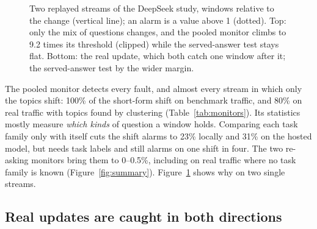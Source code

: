 \documentclass[11pt]{article}
\begin{document}
\begin{figure}[t]
  \caption{Two replayed streams of the DeepSeek study, windows relative to the
  change (vertical line); an alarm is a value above 1 (dotted). Top: only the mix of
  questions changes, and the pooled monitor climbs to 9.2 times its threshold
  (clipped) while the served-answer test stays flat. Bottom: the real update, which
  both catch one window after it; the served-answer test by the wider margin.}
  \label{fig:streams}
\end{figure}

The pooled monitor detects every fault, and almost every stream in which only the
topics shift: 100\% of the short-form shift on benchmark traffic, and 80\% on real
traffic with topics found by clustering (Table~\ref{tab:monitors}). Its statistics
mostly measure \emph{which kinds} of question a window holds. Comparing each task
family only with itself cuts the shift alarms to 23\% locally and 31\% on the
hosted model, but needs task labels and still alarms on one shift in four. The two
re-asking monitors bring them to 0--0.5\%, including on real traffic where no
task family is known (Figure~\ref{fig:summary}). Figure~\ref{fig:streams} shows
why on two single streams.

\subsection{Real updates are caught in both directions}
\label{sec:api}

\begin{table}[t]
  \centering\small
  \caption{Real changes to hosted models: share of 200 streams alarmed. Accuracy
  change is measured afterwards with the benchmark answers. --: not measurable
  (real traffic has no gradeable answers and no task labels). Last column: the
  served test's range over five replays.}
  \label{tab:updates}
  \setlength{\tabcolsep}{3pt}
\end{table}
\end{document}
